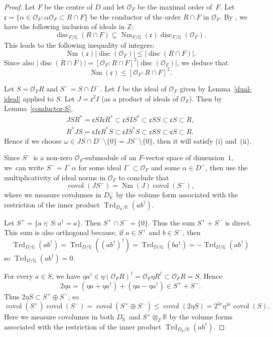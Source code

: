 \documentclass[JEP,XML,SOM,Unicode,NoFloatCountersInSection]{cedram}
\newcommand{\bQ}{\mathbb{Q}}
\newcommand{\bR}{\mathbb{R}}
\newcommand{\bZ}{\mathbb{Z}}
\newcommand{\cO}{\mathcal{O}}
\newcommand{\fc}{\mathfrak{c}}
\DeclareMathOperator{\covol}{covol}
\DeclareMathOperator{\disc}{disc}
\DeclareMathOperator{\Nm}{Nm}
\DeclareMathOperator{\Trd}{Trd}
\newcommand{\abs}[1]{\lvert #1 \rvert}
\begin{document}
\begin{proof}
Let $F$ be the centre of $D$ and let $\cO_F$ be the maximal order of~$F$.
Let $\fc\!=\!\{\alpha\!\in\!\cO_F:\alpha\cO_F\!\subset\! R{\cap} F\}$ be the conductor of the order $R \cap F$ in $\cO_F$.
By \hbox{\cite[(2)]{DCD00}}, we have the following inclusion of ideals in $\bZ$:
\[
\disc_{F/\bQ}(R \cap F) \subseteq \Nm_{F/\bQ}(\fc) \disc_{F/\bQ}(\cO_F).
\]
This leads to the following inequality of integers:
\[
\Nm(\fc) \abs{\disc(\cO_F)} \leq \abs{\disc(R \cap F)}.
\]
Since also $\abs{\disc(R \cap F)} = [\cO_F : R \cap F]^2 \abs{\disc(\cO_F)}$, we deduce that
\[
\Nm(\fc) \leq [\cO_F : R \cap F]^2.
\]

Let $S = \cO_F R$ and $S^- = S \cap D^-$.
Let $I$ be the ideal of $\cO_F$ given by Lemma~\ref{dual-ideal} applied to $S$.
Let $J = \fc^2 I$ (as a product of ideals of $\cO_F$).
Then by Lemma~\ref{conductor-S},
\begin{gather*}
JSR^* = \fc SI \fc R^* \subset \fc SIS^* \subset \fc SS \subset \fc S \subset R,
\\ R^*JS = \fc I \fc R^* S \subset \fc IS^*S \subset \fc SS \subset \fc S \subset R.
\end{gather*}
Hence if we choose $\omega \in JS \cap D^- \setminus \{0\} = JS^- \setminus \{ 0 \}$, then it will satisfy (i) and~(ii).

Since $S^-$ is a non-zero $\cO_F$-submodule of an $F$-vector space of dimension~$1$, we~can write $S^- = I^-\alpha$ for some ideal $I^- \subset \cO_F$ and some $\alpha \in D^-$, then use the multiplicativity of ideal norms in $\cO_F$ to conclude that
\[
\covol(JS^-) = \Nm(J) \covol(S^-),
\]
where we measure covolumes in $D_\bR^-$ by the volume form associated with the restriction of the inner product $\Trd_{D_\bR/\bR}(ab^\dag)$.

Let $S^+ = \{ a \in S : a^\dag = a \}$.
Then $S^+ \cap S^- = \{0\}$.
Thus the sum $S^+ + S^-$ is direct. This sum is also orthogonal because, if $a \in S^+$ and $b \in S^-$, then
\[
\Trd_{D/\bQ}(ab^\dag) = \Trd_{D/\bQ}((ab^\dag)^\dag) = \Trd_{D/\bQ}(ba^\dag) = -\Trd_{D/\bQ}(ab^\dag)
\]
so $\Trd_{D/\bQ}(ab^\dag) = 0$.

For every $a \in S$, we have $\eta a^\dag \in \eta (\cO_F R)^\dag = \cO_F \eta R^\dag \subset \cO_F R = S$.
Hence
\[
2\eta a = (\eta a+\eta a^\dag) + (\eta a-\eta a^\dag) \in S^+ + S^-.
\]
Thus $2\eta S \subset S^+\oplus S^-$, so
\begin{equation} \label{eqn:covolS+S-}
\covol(S^+) \covol(S^-) = \covol(S^+ \oplus S^-) \leq \covol(2\eta S) = 2^{4e} \eta^{4e} \covol(S).
\end{equation}
Here we measure covolumes in both $D_\bR^-$ and $S^+ \otimes_{\bZ} \bR$ by the volume forms associated with the restriction of the inner product $\Trd_{D_\bR/\bR}(ab^\dag)$.


\end{proof}
\end{document}
